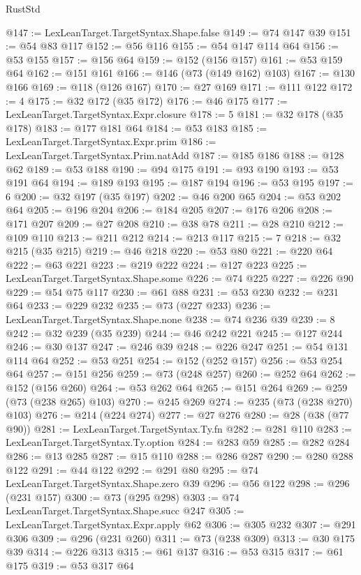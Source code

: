 \begin{lexlean}{RustStd}
\begin{coremodule}
@147 := LexLeanTarget.TargetSyntax.Shape.false
@149 := @74 @147 @39
@151 := @54 @83 @117
@152 := @56 @116
@155 := @54 @147 @114 @64
@156 := @53 @155
@157 := @156 @64
@159 := @152 (@156 @157)
@161 := @53 @159 @64
@162 := @151 @161
@166 := @146 (@73 (@149 @162) @103)
@167 := @130 @166
@169 := @118 (@126 @167)
@170 := @27 @169
@171 := @111 @122
@172 := 4
@175 := @32 @172 (@35 @172)
@176 := @46 @175
@177 := LexLeanTarget.TargetSyntax.Expr.closure
@178 := 5
@181 := @32 @178 (@35 @178)
@183 := @177 @181 @64
@184 := @53 @183
@185 := LexLeanTarget.TargetSyntax.Expr.prim
@186 := LexLeanTarget.TargetSyntax.Prim.natAdd
@187 := @185 @186
@188 := @128 @62
@189 := @53 @188
@190 := @94 @175
@191 := @93 @190
@193 := @53 @191 @64
@194 := @189 @193
@195 := @187 @194
@196 := @53 @195
@197 := 6
@200 := @32 @197 (@35 @197)
@202 := @46 @200 @65
@204 := @53 @202 @64
@205 := @196 @204
@206 := @184 @205
@207 := @176 @206
@208 := @171 @207
@209 := @27 @208
@210 := @38 @78
@211 := @28 @210
@212 := @109 @110
@213 := @211 @212
@214 := @213 @117
@215 := 7
@218 := @32 @215 (@35 @215)
@219 := @46 @218
@220 := @53 @80
@221 := @220 @64
@222 := @63 @221
@223 := @219 @222
@224 := @127 @223
@225 := LexLeanTarget.TargetSyntax.Shape.some
@226 := @74 @225
@227 := @226 @90
@229 := @54 @75 @117
@230 := @61 @88
@231 := @53 @230
@232 := @231 @64
@233 := @229 @232
@235 := @73 (@227 @233)
@236 := LexLeanTarget.TargetSyntax.Shape.none
@238 := @74 @236 @39
@239 := 8
@242 := @32 @239 (@35 @239)
@244 := @46 @242 @221
@245 := @127 @244
@246 := @30 @137
@247 := @246 @39
@248 := @226 @247
@251 := @54 @131 @114 @64
@252 := @53 @251
@254 := @152 (@252 @157)
@256 := @53 @254 @64
@257 := @151 @256
@259 := @73 (@248 @257)
@260 := @252 @64
@262 := @152 (@156 @260)
@264 := @53 @262 @64
@265 := @151 @264
@269 := @259 (@73 (@238 @265) @103)
@270 := @245 @269
@274 := @235 (@73 (@238 @270) @103)
@276 := @214 (@224 @274)
@277 := @27 @276
@280 := @28 (@38 (@77 @90))
@281 := LexLeanTarget.TargetSyntax.Ty.fn
@282 := @281 @110
@283 := LexLeanTarget.TargetSyntax.Ty.option
@284 := @283 @59
@285 := @282 @284
@286 := @13 @285
@287 := @15 @110
@288 := @286 @287
@290 := @280 @288 @122
@291 := @44 @122
@292 := @291 @80
@295 := @74 LexLeanTarget.TargetSyntax.Shape.zero @39
@296 := @56 @122
@298 := @296 (@231 @157)
@300 := @73 (@295 @298)
@303 := @74 LexLeanTarget.TargetSyntax.Shape.succ @247
@305 := LexLeanTarget.TargetSyntax.Expr.apply @62
@306 := @305 @232
@307 := @291 @306
@309 := @296 (@231 @260)
@311 := @73 (@238 @309)
@313 := @30 @175 @39
@314 := @226 @313
@315 := @61 @137
@316 := @53 @315
@317 := @61 @175
@319 := @53 @317 @64

\end{coremodule}
\end{lexlean}
